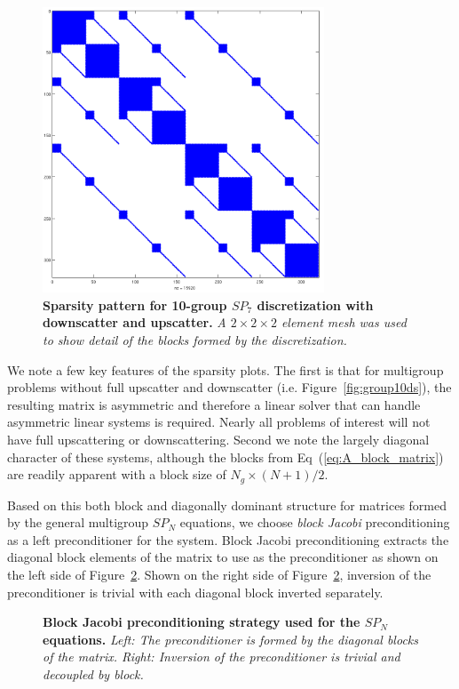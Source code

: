\begin{figure}[t!]
  \begin{center}
    \includegraphics[width=3.3in]{chapters/spn_equations/group10us.png}
  \end{center}
  \caption{\textbf{Sparsity pattern for 10-group $SP_7$ discretization
      with downscatter and upscatter.} \textit{A $2\times 2 \times 2$ element
      mesh was used to show detail of the blocks formed by the
      discretization.}}
  \label{fig:group10us}
\end{figure}

We note a few key features of the sparsity plots. The first is that
for multigroup problems without full upscatter and downscatter
(i.e. Figure~\ref{fig:group10ds}), the resulting matrix is asymmetric
and therefore a linear solver that can handle asymmetric linear
systems is required. Nearly all problems of interest will not have
full upscattering or downscattering. Second we note the largely
diagonal character of these systems, although the blocks from
Eq~(\ref{eq:A_block_matrix}) are readily apparent with a block size of
$N_g\times(N+1)/2$.

Based on this both block and diagonally dominant structure for
matrices formed by the general multigroup $SP_N$ equations, we choose
\textit{block Jacobi} preconditioning as a left preconditioner for the
system. Block Jacobi preconditioning extracts the diagonal block
elements of the matrix to use as the preconditioner as shown on the
left side of Figure~\ref{fig:block_jacobi_ex}. Shown on the right side
of Figure~\ref{fig:block_jacobi_ex}, inversion of the preconditioner
is trivial with each diagonal block inverted separately.

\begin{figure}[t!]
  \begin{center}
    \scalebox{1.6}{
     }
  \end{center}
  \caption{\textbf{Block Jacobi preconditioning strategy used for the
      $SP_N$ equations.} \textit{Left: The preconditioner is formed by
      the diagonal blocks of the matrix. Right: Inversion of the
      preconditioner is trivial and decoupled by block.}}
  \label{fig:block_jacobi_ex}
\end{figure}

